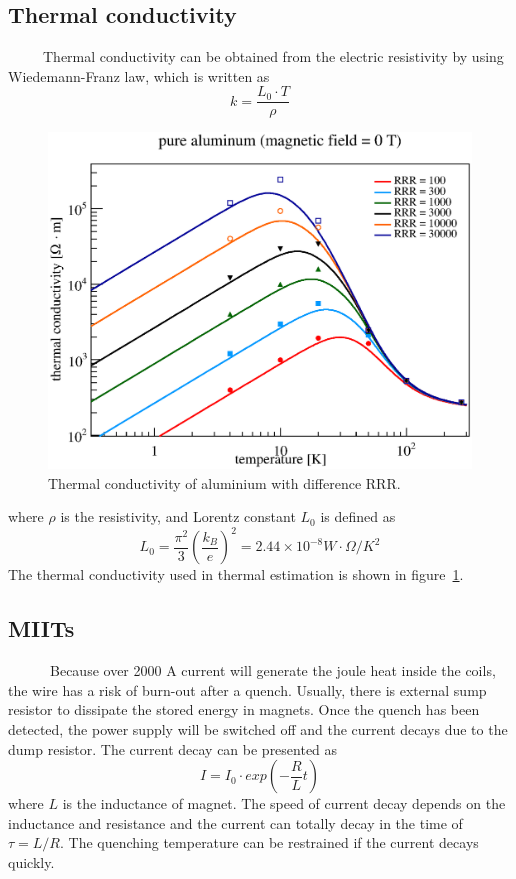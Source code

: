 \subsection{Thermal conductivity}
~~~~~Thermal conductivity can be obtained from the electric resistivity by using Wiedemann-Franz law, which is written as
\begin{equation}
 k = \frac{L_0 \cdot T}{\rho}
\end{equation}
\begin{figure}[H]
 \centering
 \includegraphics[scale=0.43]{chapter5/fig/thermalcon.eps}
 \caption{Thermal conductivity of aluminium with difference RRR.}
 \label{therm}
\end{figure}
where $\rho$ is the resistivity, and Lorentz constant $L_0$ is defined as
\begin{equation}
 L_0 = \frac{\pi^2}{3}(\frac{k_B}{e})^2 = 2.44\times 10^{-8} W\cdot\Omega /K^2
\end{equation}
The thermal conductivity used in thermal estimation is shown in figure~\ref{therm}.

  \subsection{MIITs}
~~~~~~Because over 2000 A current will generate the joule heat inside the coils, the wire has a risk of burn-out after a quench.
Usually, there is external sump resistor to dissipate the stored energy in magnets.
Once the quench has been detected, the power supply will be switched off and the current decays due to the dump resistor.
The current decay can be presented as
\begin{equation}
 I = I_0 \cdot exp(-\frac{R}{L} t)
\end{equation}
where $L$ is the inductance of magnet.
The speed of current decay depends on the inductance and resistance and the current can totally decay in the time of $\tau = L/R$.
The quenching temperature can be restrained if the current decays quickly.

